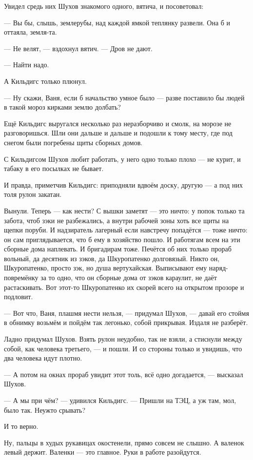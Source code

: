Увидел средь них Шухов знакомого одного, вятича, и посоветовал:

--- Вы бы, слышь, землерубы, над каждой ямкой теплянку развели. Она б и оттаяла, земля-та.

--- Не велят, --- вздохнул вятич. --- Дров не дают.

--- Найти надо.

А Кильдигс только плюнул.

--- Ну скажи, Ваня, если б начальство умное было --- разве поставило бы людей в такой мороз
кирками землю долбать?

Ещё Кильдигс выругался несколько раз неразборчиво и смолк, на морозе не разговоришься. Шли
они дальше и дальше и подошли к тому месту, где под снегом были погребены щиты сборных домов.

С Кильдигсом Шухов любит работать, у него одно только плохо --- не курит, и табаку в его
посылках не бывает.

И правда, приметчив Кильдигс: приподняли вдвоём доску, другую --- а под них толя рулон закатан.

Вынули. Теперь --- как нести? С вышки заметят --- это ничто: у попок только та забота, чтоб зэки
не разбежались, а внутри рабочей зоны хоть все щиты на щепки поруби. И надзиратель лагерный
если навстречу попадётся --- тоже ничто: он сам приглядывается, что б ему в хозяйство пошло. И
работягам всем на эти сборные дома наплевать. И бригадирам тоже. Печётся об них только
прораб вольный, да десятник из зэков, да Шкуропатенко долговязый. Никто он, Шкуропатенко,
просто зэк, но душа вертухайская. Выписывают ему наряд-повремёнку за то одно, что он сборные
дома от зэков караулит, не даёт растаскивать. Вот этот-то Шкуропатенко их скорей всего на
открытом прозоре и подловит.

--- Вот что, Ваня, плашмя нести нельзя, --- придумал Шухов, --- давай его стоймя в обнимку возьмём
и пойдём так легонько, собой прикрывая. Издаля не разберёт.

Ладно придумал Шухов. Взять рулон неудобно, так не взяли, а стиснули между собой, как
человека третьего, --- и пошли. И со стороны только и увидишь, что два человека идут плотно.

--- А потом на окнах прораб увидит этот толь, всё одно догадается, --- высказал Шухов.

--- А мы при чём? --- удивился Кильдигс. --- Пришли на ТЭЦ, а уж там, мол, было так. Неужто срывать?

И то верно.

Ну, пальцы в худых рукавицах окостенели, прямо совсем не слышно. А валенок левый держит.
Валенки --- это главное. Руки в работе разойдутся.

